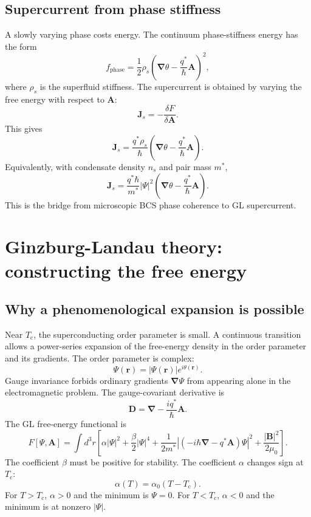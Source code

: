 \documentclass[11pt]{article}
\numberwithin{equation}{section}
\newcommand{\rvec}{\bm{r}}
\newcommand{\Avec}{\bm{A}}
\newcommand{\Bvec}{\bm{B}}
\newcommand{\Jvec}{\bm{J}}
\renewcommand{\grad}{\bm{\nabla}}
\newcommand{\Tc}{T_{\mathrm{c}}}
\newcommand{\Ord}{\Psi}
\begin{document}
\subsection{Supercurrent from phase stiffness}

A slowly varying phase costs energy. The continuum phase-stiffness energy has the form
\begin{equation}
f_{\mathrm{phase}}=\frac{1}{2}\rho_s\left(\grad\theta-\frac{q^*}{\hbar}\Avec\right)^2,
\end{equation}
where $\rho_s$ is the superfluid stiffness. The supercurrent is obtained by varying the free energy with respect to $\Avec$:
\begin{equation}
\Jvec_s=-\frac{\delta F}{\delta \Avec}.
\end{equation}
This gives
\begin{equation}
\Jvec_s=\frac{q^*\rho_s}{\hbar}\left(\grad\theta-\frac{q^*}{\hbar}\Avec\right).
\end{equation}
Equivalently, with condensate density $n_s$ and pair mass $m^*$,
\begin{equation}
\Jvec_s=\frac{q^*\hbar}{m^*}|\Ord|^2\left(\grad\theta-\frac{q^*}{\hbar}\Avec\right).
\label{eq:phase_current}
\end{equation}
This is the bridge from microscopic BCS phase coherence to GL supercurrent.

\section{Ginzburg-Landau theory: constructing the free energy}

\subsection{Why a phenomenological expansion is possible}

Near $\Tc$, the superconducting order parameter is small. A continuous transition allows a power-series expansion of the free-energy density in the order parameter and its gradients. The order parameter is complex:
\begin{equation}
\Ord(\rvec)=|\Ord(\rvec)|e^{i\theta(\rvec)}.
\end{equation}
Gauge invariance forbids ordinary gradients $\grad\Ord$ from appearing alone in the electromagnetic problem. The gauge-covariant derivative is
\begin{equation}
\bm{D}=\grad-\frac{i q^*}{\hbar}\Avec.
\end{equation}
The GL free-energy functional is
\begin{equation}
\boxed{
F[\Ord,\Avec]=\int d^3r\left[\alpha|\Ord|^2+\frac{\beta}{2}|\Ord|^4+\frac{1}{2m^*}\left|\left(-i\hbar\grad-q^*\Avec\right)\Ord\right|^2+\frac{|\Bvec|^2}{2\mu_0}\right].}
\label{eq:gl_functional}
\end{equation}
The coefficient $\beta$ must be positive for stability. The coefficient $\alpha$ changes sign at $\Tc$:
\begin{equation}
\alpha(T)=\alpha_0(T-\Tc).
\end{equation}
For $T>\Tc$, $\alpha>0$ and the minimum is $\Ord=0$. For $T<\Tc$, $\alpha<0$ and the minimum is at nonzero $|\Ord|$.
\end{document}
